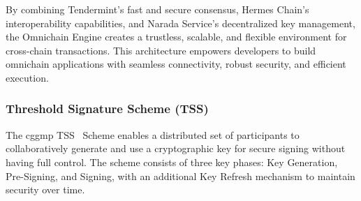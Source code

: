 By combining Tendermint’s fast and secure consensus, Hermes Chain’s interoperability capabilities, and Narada Service’s decentralized key management, the Omnichain Engine creates a trustless, scalable, and flexible environment for cross-chain transactions. This architecture empowers developers to build omnichain applications with seamless connectivity, robust security, and efficient execution.


\subsubsection{Threshold Signature Scheme (TSS)}

The cggmp TSS~\cite{tss} Scheme enables a distributed set of participants to collaboratively generate and use a cryptographic key for secure signing without having full control. The scheme consists of three key phases: \textsf{Key Generation}, \textsf{Pre-Signing}, and \textsf{Signing}, with an additional \textsf{Key Refresh} mechanism to maintain security over time.  

